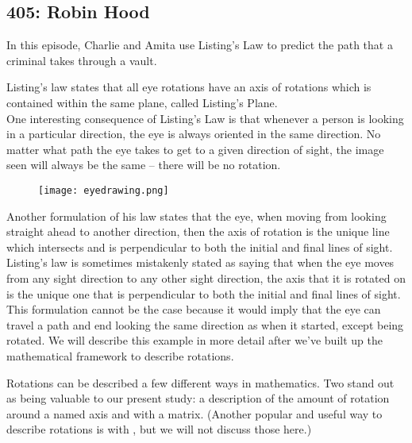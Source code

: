 \newpage
\subsection{405: Robin Hood}\label{405}

In this episode, Charlie and Amita use Listing's Law to predict the path that a criminal takes through a vault. \\


Listing's law states that all eye rotations have an axis of rotations which is contained within the same plane, called Listing's Plane. \\

One interesting consequence of Listing's Law is that whenever a person is looking in a particular direction, the eye is always oriented in the same direction. No matter what path the eye takes to get to a given direction of sight, the image seen will always be the same -- there will be no rotation. \\

\begin{figure}[H]
   \centering
   \texttt{[image: eyedrawing.png]} 
\end{figure}

Another formulation of his law states that the eye, when moving from looking straight ahead to another direction, then the axis of rotation is the unique line which intersects and is perpendicular to both the initial and final lines of sight. Listing's law is sometimes mistakenly stated as saying that when the eye moves from any sight direction to any other sight direction, the axis that it is rotated on is the unique one that is perpendicular to both the initial and final lines of sight. This formulation cannot be the case because it would imply that the eye can travel a path and end looking the same direction as when it started, except being rotated. We will describe this example in more detail after we've built up the mathematical framework to describe rotations. \\


Rotations can be described a few different ways in mathematics. Two stand out as being valuable to our present study: a description of the amount of rotation around a named axis and with a matrix. (Another popular and useful way to describe rotations is with , but we will not discuss those here.) \\

